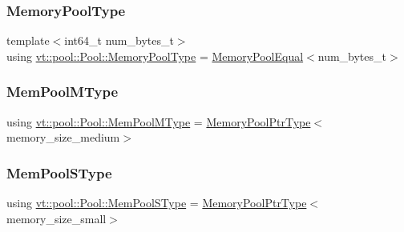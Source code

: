 \subsubsection{\texorpdfstring{Memory\+Pool\+Type}{MemoryPoolType}}
{\footnotesize\ttfamily template$<$int64\+\_\+t num\+\_\+bytes\+\_\+t$>$ \\
using \hyperlink{structvt_1_1pool_1_1_pool_a06673914350d933ad5205155eca14a3b}{vt\+::pool\+::\+Pool\+::\+Memory\+Pool\+Type} =  \hyperlink{structvt_1_1pool_1_1_memory_pool_equal}{Memory\+Pool\+Equal}$<$num\+\_\+bytes\+\_\+t$>$}

\mbox{\label{structvt_1_1pool_1_1_pool_a8a201b9a843e47cd4e7b568a8e4483da}} 
\subsubsection{\texorpdfstring{Mem\+Pool\+M\+Type}{MemPoolMType}}
{\footnotesize\ttfamily using \hyperlink{structvt_1_1pool_1_1_pool_a8a201b9a843e47cd4e7b568a8e4483da}{vt\+::pool\+::\+Pool\+::\+Mem\+Pool\+M\+Type} =  \hyperlink{structvt_1_1pool_1_1_pool_a21e20f5b56c3bae4f0d0cc36ed9c5eee}{Memory\+Pool\+Ptr\+Type}$<$memory\+\_\+size\+\_\+medium$>$\hspace{0.3cm}{\ttfamily [private]}}

\mbox{\label{structvt_1_1pool_1_1_pool_a9f94985824d12c43357cfe50eaaefd38}} 
\subsubsection{\texorpdfstring{Mem\+Pool\+S\+Type}{MemPoolSType}}
{\footnotesize\ttfamily using \hyperlink{structvt_1_1pool_1_1_pool_a9f94985824d12c43357cfe50eaaefd38}{vt\+::pool\+::\+Pool\+::\+Mem\+Pool\+S\+Type} =  \hyperlink{structvt_1_1pool_1_1_pool_a21e20f5b56c3bae4f0d0cc36ed9c5eee}{Memory\+Pool\+Ptr\+Type}$<$memory\+\_\+size\+\_\+small$>$\hspace{0.3cm}{\ttfamily [private]}}

\mbox{\label{structvt_1_1pool_1_1_pool_a4030898e09d0160c24743a7b949c0d46}} 
